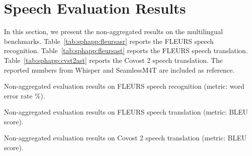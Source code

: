 \section{Speech Evaluation Results}
\label{section:speechappendix}
In this section, we present the non-aggregated results on the multilingual benchmarks.
Table~\ref{tab:sphapp:fleursasr} reports the FLEURS speech recognition.
Table~\ref{tab:sphapp:fleursast} reports the FLEURS speech translation.
Table~\ref{tab:sphapp:cvst2ast} reports the Covost 2 speech translation.
The reported numbers from Whisper and SeamlessM4T are included as reference.


\begin{table}
	\centering
	
	\caption{Non-aggregated evaluation results on FLEURS speech recognition (metric: word error rate \%).}
	\label{tab:sphapp:fleursasr}
\end{table}




\begin{table}
	\centering
	
	\caption{Non-aggregated evaluation results on FLEURS speech translation (metric: BLEU score).}
	\label{tab:sphapp:fleursast}
\end{table}

\begin{table}
	\centering
	
	\caption{Non-aggregated evaluation results on Covost 2 speech translation (metric: BLEU score).}
	\label{tab:sphapp:cvst2ast}
\end{table}


